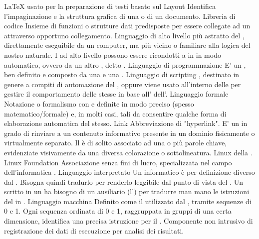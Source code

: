 \elemento
{LaTeX} 
{ usato per la preparazione di testi basato sul  }
\elemento
{Layout} 
{Identifica l'impaginazione e la struttura grafica di una  o di un documento.}
\elemento
{Libreria di codice} 
{Insieme di funzioni o strutture dati predisposte per essere collegate ad un   attraverso opportuno collegamento.}
\elemento
{Linguaggio di alto livello} 
{ più astratto del , direttamente eseguibile da un computer, ma più vicino o familiare alla logica del nostro  naturale. I  ad alto livello possono essere ricondotti a  in  in modo automatico, ovvero da un altro , detto .}
\elemento
{Linguaggio di programmazione} 
{E' un , ben definito e composto da una  e una .}
\elemento
{Linguaggio di scripting} 
{, destinato in genere a compiti di automazione del , oppure viene usato all'interno delle  per gestire il comportamento delle  stesse in base all'  dell'.}
\elemento
{Linguaggio formale} 
{Notazione o formalismo con  e  definite in modo preciso (spesso matematico/formale) e, in molti casi, tali da consentire qualche forma di elaborazione automatica del  stesso.}
\elemento
{Link} 
{Abbreviazione di "hyperlink". E' un  in grado di rinviare a un contenuto informativo presente in un dominio fisicamente o virtualmente separato. Il  è di solito associato ad una o più parole chiave, evidenziate visivamente da una diversa colorazione o sottolineatura.}
\elemento
{Linux} 
{ della .}
\elemento
{Linux Foundation} 
{Associazione senza fini di lucro, specializzata nel campo dell'informatica .}
\elemento
{Linguaggio interpretato} 
{Un  informatico è per definizione diverso dal . Bisogna quindi tradurlo per renderlo leggibile dal punto di vista del . Un  scritto in un  ha bisogno di un  ausiliario (l') per tradurre man mano le istruzioni del  in .}
\elemento
{Linguaggio macchina} 
{Definito come il  utilizzato dal , tramite sequenze di 0 e 1. Ogni sequenza ordinata di 0 e 1, raggruppata in gruppi di una certa dimensione, identifica una precisa istruzione per il .}
{Componente non intrusivo di registrazione dei dati di esecuzione per analisi dei risultati.}

